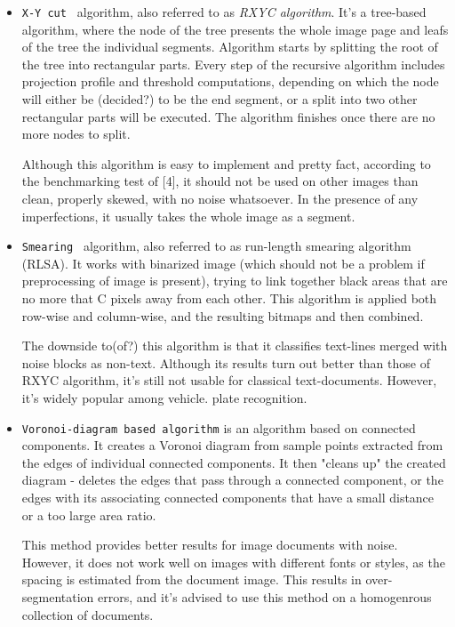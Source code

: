 \begin{itemize}
\item\texttt{X-Y cut } algorithm, also referred to as \emph{RXYC algorithm}. It's a tree-based algorithm, where the node of the tree presents the whole image page and leafs of the tree the individual segments. Algorithm starts by splitting the root of the tree into rectangular parts. Every step of the recursive algorithm includes projection profile and threshold computations, depending on which the node will either be (decided?) to be the end segment, or a split into two other rectangular parts will be executed. The algorithm finishes once there are no more nodes to split.

Although this algorithm is easy to implement and pretty fact, according to the benchmarking test of [4], it should not be used on other images than clean, properly skewed, with no noise whatsoever. In the presence of any imperfections, it usually takes the whole image as a segment.

\item\texttt{Smearing } algorithm, also referred to as run-length smearing algorithm (RLSA). It works with binarized image (which should not be a problem if preprocessing of image is present), trying to link together black areas that are no more that C pixels away from each other. This algorithm is applied both row-wise and column-wise, and the resulting bitmaps and then combined.

The downside to(of?) this algorithm is that it classifies text-lines merged with noise blocks as non-text. Although its results turn out better than those of RXYC algorithm, it's still not usable for classical text-documents. However, it's widely popular among vehicle. plate recognition.

\item\texttt{Voronoi-diagram based algorithm} is an algorithm based on connected components. It creates a Voronoi diagram from sample points extracted from the edges of individual connected components. It then "cleans up" the created diagram - deletes the edges that pass through a connected component, or the edges with its associating connected components that have a small distance or a too large area ratio.

This method provides better results for image documents with noise. However, it does not work well on images with different fonts or styles, as the spacing is estimated from the document image. This results in over-segmentation errors, and it's advised to use this method on a homogenrous collection of documents.


\end{itemize}
